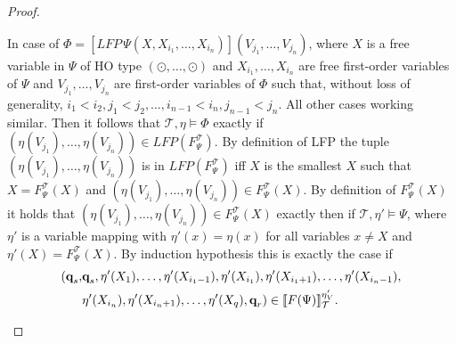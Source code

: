 \begin{proof}
\begin{compactitem}
        \item In case of $\Phi = [LFP\,\Psi(X, X_{i_1}, \dots, X_{i_n})](V_{j_1}, \dots, V_{j_n})$, where $X$ is a
        free variable in $\Psi$ of HO type $(\odot, \dots, \odot)$ and $X_{i_1}, \dots, X_{i_n}$ are free first-order
        variables of $\Psi$ and $V_{j_1}, \dots, V_{j_n}$ are first-order variables of $\Phi$ such that, without loss of generality, $i_1 < i_2, j_1 < j_2, \dots, i_{n-1} < i_ n, j_{n-1} < j_n$. All other cases working similar. Then it follows that
        $\mathcal{T}, \eta \models \Phi$ exactly if $(\eta(V_{j_1}), \dots, \eta(V_{j_n})) \in LFP
        (F_\Psi^\mathcal{T})$. By definition of LFP the tuple $(\eta(V_{j_1}), \dots, \eta(V_{j_n}))$ is in
        $LFP(F_\Psi^\mathcal{T})$ iff $X$ is the smallest $X$ such that $X = F_\Psi^\mathcal{T}(X)$ and $(\eta(V_{j_1}), \dots, \eta(V_{j_n})) \in
        F_\Psi^\mathcal{T}(X)$. By definition of $F_\Psi^\mathcal{T}(X)$ it holds that $(\eta
        (V_{j_1}), \dots, \eta(V_{j_n})) \in F_\Psi^\mathcal{T}(X)$ exactly then if $\mathcal{T}, \eta' 
        \models \Psi$, where $\eta'$ is a variable mapping with $\eta'(x) = \eta(x)$ for all variables $x \neq X$ and $\eta'(X) = F_\Psi^\mathcal{T}(X)$. By induction hypothesis this is exactly the case if
        \begin{align*}
        (\emph{q}_s, &\emph{q}_s, \eta'(X_1), \dots, \eta'(X_{i_1-1}), \eta'(X_{i_1}), \eta'(X_{i_1+1}), \dots, \eta'(X_{i_n-1}), \\&\eta'(X_{i_n}), \eta'(X_{i_n+1}), \dots, \eta'
            (X_q), \emph{q}_r) \in \llbracket
        F(\Psi) \rrbracket^{\eta'_V}_\mathcal{T}.
        \end{align*}
        

\end{compactitem}
\end{proof}
